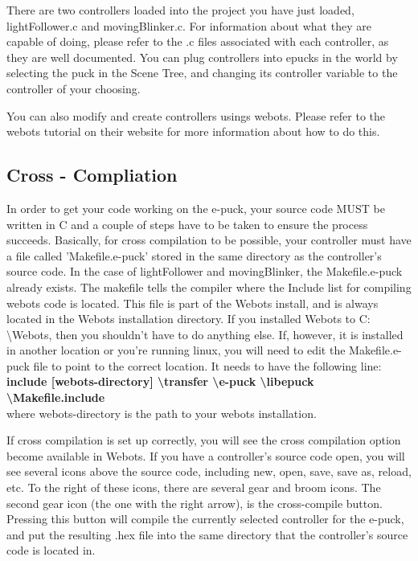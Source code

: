 \documentclass[11pt]{article} %
\begin{document}
There are two controllers loaded into the project you have just loaded, lightFollower.c and movingBlinker.c.  For information about what they are capable of doing, please refer to the .c files associated with each controller, as they are well documented.  You can plug controllers into epucks in the world by selecting the puck in the Scene Tree, and changing its controller variable to the controller of your choosing.

You can also modify and create controllers usings webots.  Please refer to the webots tutorial on their website for more information about how to do this.

\subsection{Cross - Compliation}

In order to get your code working on the e-puck, your source code MUST be written in C and a couple of steps have to be taken to ensure the process succeeds.  Basically, for cross compilation to be possible, your controller must have a file called 'Makefile.e-puck' stored in the same directory as the controller's source code.  In the case of lightFollower and movingBlinker, the Makefile.e-puck already exists. The makefile tells the compiler where the Include list for compiling webots code is located.  This file is part of the Webots install, and is always located in the Webots installation directory. If you installed Webots to C: \textbackslash Webots, then you shouldn't have to do anything else.  If, however, it is installed in another location or you're running linux, you will need to edit the Makefile.e-puck file to point to the correct location.  It needs to have the following line:\\  {\bf include [webots-directory] \textbackslash transfer \textbackslash e-puck \textbackslash libepuck \textbackslash Makefile.include } \\where webots-directory is the path to your webots installation.

If cross compilation is set up correctly, you will see the cross compilation option become available in Webots.  If you have a controller's source code open, you will see several icons above the source code, including new, open, save, save as, reload, etc.  To the right of these icons, there are several gear and broom icons.  The second gear icon (the one with the right arrow), is the cross-compile button.  Pressing this button will compile the currently selected controller for the e-puck, and put the resulting .hex file into the same directory that the controller's source code is located in.
\end{document}
